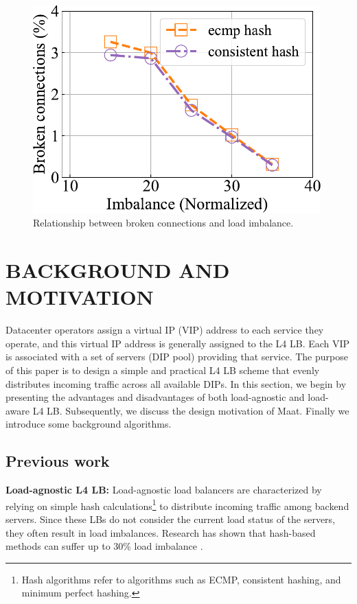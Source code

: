 \begin{figure}[htbp]
\begin{minipage}[t]{0.33\linewidth}
		\includegraphics[width=0.988\textwidth]{experiment/2brokenimbalance.pdf}
		\caption{Relationship between broken connections and load imbalance.}
		\label{3}
	\end{minipage}
\end{figure}

\section{BACKGROUND AND MOTIVATION}
Datacenter operators assign a virtual IP (VIP) address to each service they operate, and this virtual IP address is generally assigned to the L4 LB. Each VIP is associated with a set of servers (DIP pool) providing that service. The purpose of this paper is to design a simple and practical L4 LB scheme that evenly distributes incoming traffic across all available DIPs. In this section, we begin by presenting the advantages and disadvantages of both load-agnostic and load-aware L4 LB. Subsequently, we discuss the design motivation of Maat. Finally we introduce some background algorithms.
\subsection{Previous work}
\textbf{Load-agnostic L4 LB:}
Load-agnostic load balancers are characterized by relying on simple hash calculations\footnote{Hash algorithms refer to algorithms such as ECMP, consistent hashing, and minimum perfect hashing.} to distribute incoming traffic among backend servers. Since these LBs do not consider the current load status of the servers, they often result in load imbalances. Research has shown that hash-based methods can suffer up to 30\% load imbalance \cite{eisenbud2016maglev}.

